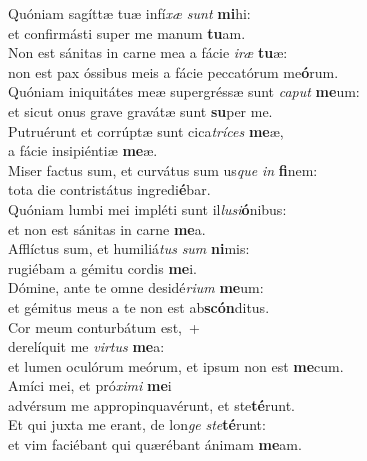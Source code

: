 \evenverse Quóniam sagíttæ tuæ infí\textit{xæ} \textit{sunt} \textbf{mi}hi:~\*\\
\evenverse et confirmásti super me manum \textbf{tu}am.\\
\oddverse Non est sánitas in carne mea a fácie \textit{i}\textit{ræ} \textbf{tu}æ:~\*\\
\oddverse non est pax óssibus meis a fácie peccatórum me\textbf{ó}rum.\\
\evenverse Quóniam iniquitátes meæ supergréssæ sunt \textit{ca}\textit{put} \textbf{me}um:~\*\\
\evenverse et sicut onus grave gravátæ sunt \textbf{su}per me.\\
\oddverse Putruérunt et corrúptæ sunt cica\textit{trí}\textit{ces} \textbf{me}æ,~\*\\
\oddverse a fácie insipiéntiæ \textbf{me}æ.\\
\evenverse Miser factus sum, et curvátus sum us\textit{que} \textit{in} \textbf{fi}nem:~\*\\
\evenverse tota die contristátus ingredi\textbf{é}bar.\\
\oddverse Quóniam lumbi mei impléti sunt il\textit{lu}\textit{si}\textbf{ó}nibus:~\*\\
\oddverse et non est sánitas in carne \textbf{me}a.\\
\evenverse Afflíctus sum, et humiliá\textit{tus} \textit{sum} \textbf{ni}mis:~\*\\
\evenverse rugiébam a gémitu cordis \textbf{me}i.\\
\oddverse Dómine, ante te omne desidé\textit{ri}\textit{um} \textbf{me}um:~\*\\
\oddverse et gémitus meus a te non est ab\textbf{scón}ditus.\\
\evenverse Cor meum conturbátum est,~+\\
\evenverse  derelíquit me \textit{vir}\textit{tus} \textbf{me}a:~\*\\
\evenverse et lumen oculórum meórum, et ipsum non est \textbf{me}cum.\\
\oddverse Amíci mei, et pró\textit{xi}\textit{mi} \textbf{me}i~\*\\
\oddverse advérsum me appropinquavérunt, et ste\textbf{té}runt.\\
\evenverse Et qui juxta me erant, de lon\textit{ge} \textit{ste}\textbf{té}runt:~\*\\
\evenverse et vim faciébant qui quærébant ánimam \textbf{me}am.\\

